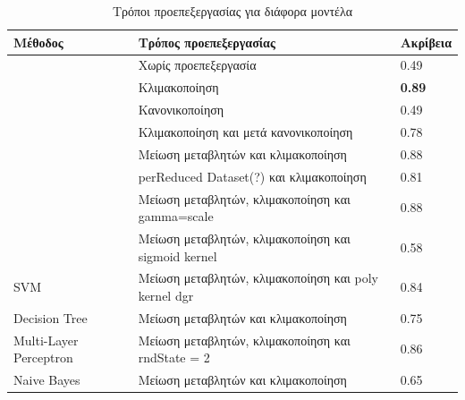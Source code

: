 \begin{table}[H]
\begin{tabular}{|l|l|l|}
\hline
\textbf{Μέθοδος}       & \textbf{Τρόπος προεπεξεργασίας}                                               & \textbf{Ακρίβεια}            \\ \hline
                       & Χωρίς προεπεξεργασία                                                          & 0.49                         \\ \cline{2-3} 
                       & Κλιμακοποίηση                                                                 & \textbf{0.89}                \\ \cline{2-3} 
                       & Κανονικοποίηση                                                                & 0.49                         \\ \cline{2-3} 
                       & Κλιμακοποίηση και μετά κανονικοποίηση                                         & 0.78                         \\ \cline{2-3} 
                       & Μείωση μεταβλητών και κλιμακοποίηση                                           & 0.88                         \\ \cline{2-3} 
                       & perReduced Dataset(?) και κλιμακοποίηση                                       & 0.81                         \\ \cline{2-3} 
                       & Μείωση μεταβλητών,  κλιμακοποίηση και gamma=scale                             & 0.88                         \\ \cline{2-3} 
                       & Μείωση μεταβλητών,  κλιμακοποίηση και sigmoid kernel                          & 0.58                         \\ \cline{2-3} 
\multirow{-9}{*}{SVM}  & Μείωση μεταβλητών,  κλιμακοποίηση και poly kernel dgr                         & 0.84                         \\ \hline
Decision Tree          & Μείωση μεταβλητών και κλιμακοποίηση                                           & 0.75                         \\ \hline
Multi-Layer Perceptron & Μείωση μεταβλητών, κλιμακοποίηση και rndState = 2                             & 0.86                         \\ \hline
Naive Bayes            & Μείωση μεταβλητών και κλιμακοποίηση                                           & 0.65                         \\ \hline
\end{tabular}
\caption{Τρόποι προεπεξεργασίας για διάφορα μοντέλα}
\label{table:tab}
\end{table}

